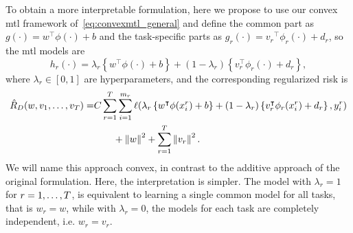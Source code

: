 To obtain a more interpretable formulation, here we propose to use our convex \acrshort{mtl} framework of~\eqref{eq:convexmtl_general} and define the common part as $g(\cdot) =  {w}^\intercal {\phi(\cdot)} + b$ and the task-specific parts as $g_r(\cdot) = {v_r}^\intercal {\phi_r(\cdot)} + d_r$, so the \acrshort{mtl} models are
\begin{equation}
    \nonumber
    \label{eq:convexmtl_modeldef}
    h_r(\cdot) = \lambda_r \left\lbrace {w}^\intercal {\phi(\cdot)} + b \right\rbrace + (1 - \lambda_r) \left\lbrace {v}_r^\intercal {\phi_r(\cdot)} + d_r \right\rbrace ,
\end{equation}
where $\lambda_r \in \left[0, 1\right]$ are hyperparameters, and the corresponding regularized risk is 
\begin{equation}
    \nonumber
    \begin{aligned}
        \hat{R}_{D} ({w, v_1, \ldots, v_T}) = &C \sum_{r=1}^{T} \sum_{i=1}^{m_r} \ell(\lambda_r \left\lbrace {w}^\intercal {\phi(x_i^r)} + b \right\rbrace + (1 - \lambda_r) \left\lbrace {v}_r^\intercal {\phi_r(x_i^r)} + d_r \right\rbrace, y_i^r) \\ 
        &\qquad + \left\lVert{w}\right\rVert^2 + \sum_{r=1}^T \left\lVert{v}_r\right\rVert^2 .
    \end{aligned}
\end{equation}
We will name this approach {convex}, in contrast to the {additive} approach of the original formulation.
Here, the interpretation is simpler. The model with $\lambda_r = 1$ for $r=1, \ldots, T$, is equivalent to learning a single common model for all tasks, that is ${w}_r = {w}$, while with $\lambda_r=0$, the models for each task are completely independent, i.e. ${w}_r = {v}_r$.
%

